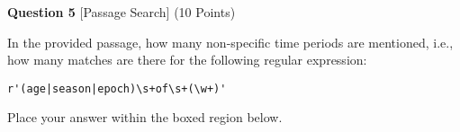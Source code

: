 \documentclass{article}
\begin{document}

\vspace{1.0cm}


\begin{minipage}{\textwidth}
    \noindent
    \textbf{Question 5} [Passage Search] (10 Points)
    \vspace{0.25cm}

    \noindent
    In the provided passage, how many non-specific time periods are mentioned,
i.e., how many matches are there for the following regular expression:

\begin{lstlisting}
r'(age|season|epoch)\s+of\s+(\w+)'
\end{lstlisting}

    \vspace{0.25cm}
    Place your answer within the boxed region below.
    \vspace{0.25cm}

\end{minipage}


\vspace{1.0cm}

\end{document}
